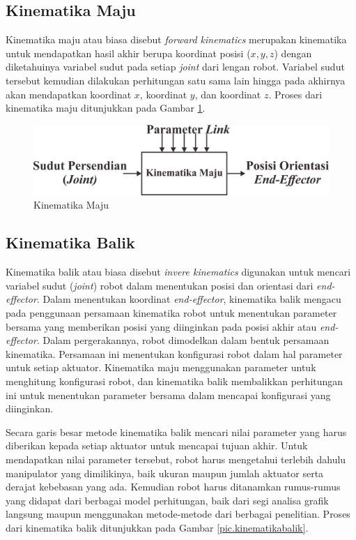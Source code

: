\subsection{Kinematika Maju}
Kinematika maju atau biasa disebut \textit{forward kinematics} merupakan kinematika untuk mendapatkan hasil akhir berupa koordinat posisi ($x, y, z$) dengan diketahuinya variabel sudut pada setiap \textit{joint} dari lengan robot.  Variabel sudut tersebut kemudian dilakukan perhitungan satu sama lain hingga pada akhirnya akan mendapatkan koordinat $x$, koordinat $y$, dan koordinat $z$\cite{alasar}. Proses dari kinematika maju ditunjukkan pada Gambar \ref{pic.kinematikamaju}. 
\begin{figure}[H]
	\centering
	\includegraphics[width=12cm]{gambar/Kinematika_maju.png}
	\caption{Kinematika Maju}
	\label{pic.kinematikamaju}
\end{figure}


\subsection{Kinematika Balik}
Kinematika balik atau biasa disebut \textit{invere kinematics} digunakan untuk mencari variabel sudut (\textit{joint}) robot dalam menentukan posisi dan orientasi dari \textit{end-effector}. Dalam menentukan koordinat \textit{end-effector}, kinematika balik mengacu pada penggunaan persamaan kinematika robot untuk menentukan parameter bersama yang memberikan posisi yang diinginkan pada posisi akhir atau \textit{end-effector}.  Dalam pergerakannya, robot dimodelkan dalam bentuk persamaan kinematika. Persamaan ini menentukan konfigurasi robot dalam hal parameter untuk setiap aktuator. Kinematika maju menggunakan parameter untuk menghitung konfigurasi robot, dan kinematika balik membalikkan perhitungan ini untuk menentukan parameter bersama dalam mencapai konfigurasi yang diinginkan\cite{cahyono2015}. 

Secara garis besar metode kinematika balik mencari nilai parameter yang harus diberikan kepada setiap aktuator untuk mencapai tujuan akhir. Untuk mendapatkan nilai parameter tersebut, robot harus mengetahui terlebih dahulu manipulator yang dimilikinya, baik ukuran maupun jumlah aktuator serta derajat kebebasan yang ada. Kemudian robot harus ditanamkan rumus-rumus yang didapat dari berbagai model perhitungan, baik dari segi analisa grafik langsung maupun menggunakan metode-metode dari berbagai penelitian\cite{cahyono2}. Proses dari kinematika balik ditunjukkan pada Gambar \ref{pic.kinematikabalik}.

